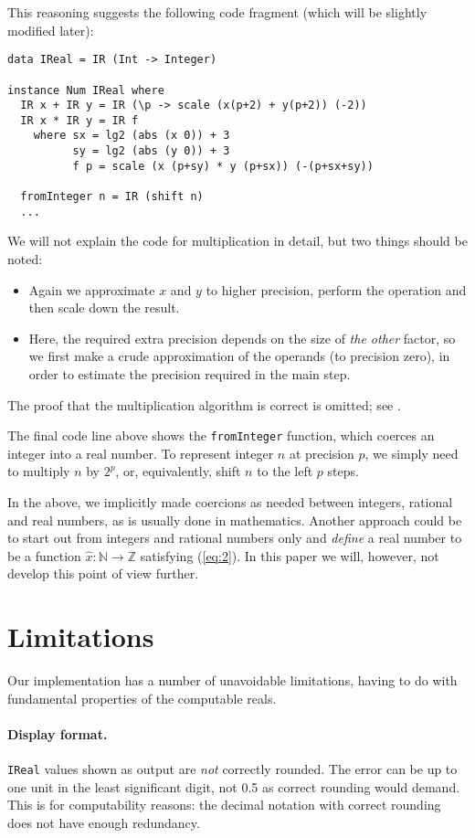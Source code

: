 \documentclass[9pt, a4, twocolumn]{article}
\begin{document}
This reasoning suggests the following code fragment (which will be
slightly modified later):
\begin{verbatim}
data IReal = IR (Int -> Integer)

instance Num IReal where
  IR x + IR y = IR (\p -> scale (x(p+2) + y(p+2)) (-2))  
  IR x * IR y = IR f
    where sx = lg2 (abs (x 0)) + 3
          sy = lg2 (abs (y 0)) + 3
          f p = scale (x (p+sy) * y (p+sx)) (-(p+sx+sy))

  fromInteger n = IR (shift n)
  ...
\end{verbatim}
We will not explain the code for multiplication in detail, but two
things should be noted:
\begin{itemize}
\item Again we approximate $x$ and $y$ to higher precision, perform
  the operation and then scale down the result.
\item Here, the required extra precision depends on the size of \emph{the
  other} factor, so we first make a crude approximation of the operands
  (to precision zero), in order to estimate the precision required in
  the main step.
\end{itemize}
The proof that the multiplication algorithm is correct is omitted; see
\cite{boehm, LesterGowland}.

The final code line above shows the \texttt{fromInteger} function,
which coerces an integer into a real number. To represent integer $n$
at precision $p$, we simply need to multiply $n$ by $2^p$, or, equivalently, shift $n$ to the left $p$ steps.

In the above, we implicitly made coercions as needed between integers,
rational and real numbers, as is usually done in mathematics. Another
approach could be to start out from integers and rational numbers only
and \emph{define} a real number to be a function $\hat{x} : \mathbb{N}
\rightarrow \mathbb{Z}$ satisfying (\ref{eq:2}).
In this paper we will, however, not develop this point of view further.

\section{Limitations}

Our implementation has a number of unavoidable limitations, having to
do with fundamental properties of the computable reals.

\paragraph{Display format.}
\texttt{IReal} values shown as output are \emph{not} correctly
rounded. The error can be up to
one unit in the least significant digit, not 0.5 as correct rounding
would demand. This is for computability reasons: the decimal
notation with correct rounding does not have enough redundancy.
\end{document}
